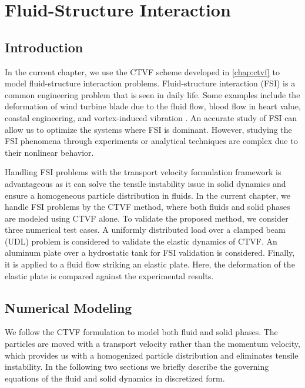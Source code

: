 \chapter{Fluid-Structure Interaction}\label{chap:fsi}
\section{Introduction}
In the current chapter, we use the CTVF scheme developed in \cref{chap:ctvf}
to model fluid-structure interaction problems. Fluid-structure interaction (FSI)
is a common engineering problem that is seen in daily life. Some examples
include the deformation of wind turbine blade due to the fluid flow, blood flow
in heart value, coastal engineering, and vortex-induced vibration
\parencite{williamson2004vortex,bearman2011circular}. An accurate study of FSI can
allow us to optimize the systems where FSI is dominant. However, studying the
FSI phenomena through experiments or analytical techniques are complex due to
their nonlinear behavior.

Handling FSI problems with the transport velocity formulation framework is
advantageous as it can solve the tensile instability issue in solid dynamics and
ensure a homogeneous particle distribution in fluids. In the current chapter, we handle
FSI problems by the CTVF method, where both fluids and solid phases are modeled
using CTVF alone. To validate the proposed method, we consider three numerical
test cases. A uniformly distributed load over a clamped beam (UDL) problem is
considered to validate the elastic dynamics of CTVF. An aluminum plate over a
hydrostatic tank for FSI validation is considered. Finally, it is applied to a
fluid flow striking an elastic plate. Here, the deformation of the elastic plate
is compared against the experimental results.

\section{Numerical Modeling}\label{sec2}
We follow the CTVF formulation to model both fluid and solid phases. The
particles are moved with a transport velocity rather than the momentum velocity,
which provides us with a homogenized particle distribution and eliminates
tensile instability. In the following two sections we briefly describe the
governing equations of the fluid and solid dynamics in discretized form.


